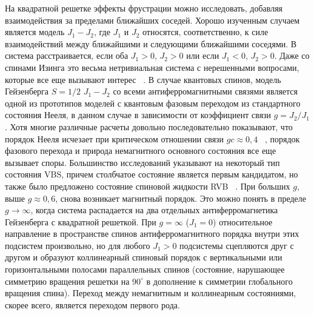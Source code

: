 \documentclass[11pt]{article}
\begin{document}
На квадратной решетке эффекты фрустрации можно исследовать, добавляя взаимодействия за пределами ближайших соседей. Хорошо изученным случаем является модель $J_1 -J_2$, где $J_1$ и $J_2$ относятся, соответственно, к силе взаимодействий между ближайшими и следующими ближайшими соседями. В система расстраивается, если оба $J_1> 0$, $J_2> 0$ или если $J_1 <0$, $J_2> 0$. Даже со спинами Изинга это весьма нетривиальная система с нерешенными вопросами, которые все еще вызывают интерес ~\cite{pre_80_051117, phys_145_012051, prl_108_045702}. 
В случае квантовых спинов, модель Гейзенберга $S = 1/2$ $J_1-J_2$ со всеми антиферромагнитными связями является одной из прототипов моделей с квантовым фазовым переходом из стандартного состояния Нееля, в данном случае в зависимости от коэффициент связи $g = J_2 / J_1$.
Хотя многие различные расчеты довольно последовательно показывают, что порядок Нееля исчезает при критическом отношении связи $gc ≈ 0,4$ ~\cite{prl_63_2148, phys_6_675, prb_60_7278, prb_63_104420, el_74_896, prb_79_224431, prb_79_024409}, порядок фазового перехода и природа немагнитного основного состояния все еще вызывает споры. Большинство исследований указывают на некоторый тип состояния VBS, причем столбчатое состояние является первым кандидатом, но также было предложено состояние спиновой жидкости RVB ~\cite{prl_87_097201}.
При больших $g$, выше $g ≈ 0,6$, снова возникает магнитный порядок. Это можно понять в пределе $g \to \infty$, когда система распадается на два отдельных антиферромагнетика Гейзенберга с квадратной решеткой. При $g = \infty$ ($J_1 = 0$) относительное направление в пространстве спинов антиферромагнитного порядка внутри этих подсистем произвольно, но для любого $J_1> 0$ подсистемы сцепляются друг с другом и образуют коллинеарный спиновый порядок с вертикальными или горизонтальными полосами параллельных спинов (состояние, нарушающее симметрию вращения решетки на $90^\circ$ в дополнение к симметрии глобального вращения спина). Переход между немагнитным и коллинеарным состояниями, скорее всего, является переходом первого рода.
\end{document}
